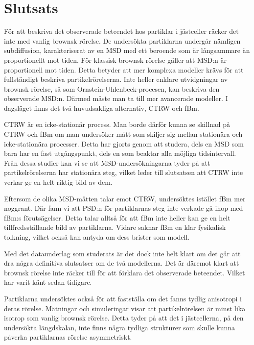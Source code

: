 \chapter{Slutsats}

För att beskriva det observerade beteendet hos partiklar i jästceller räcker det inte med vanlig brownsk rörelse. De undersökta partiklarna undergår nämligen subdiffusion, karakteriserat av en MSD med ett beroende som är långsammare än proportionellt mot tiden. För klassisk brownsk rörelse gäller att MSD:n är proportionell mot tiden. Detta betyder att mer komplexa modeller krävs för att fullständigt beskriva partikelrörelserna. 
Inte heller enklare utvidgningar av brownsk rörelse, så som Ornstein-Uhlenbeck-procesen, kan beskriva den observerade MSD:n. Därmed måste man ta till mer avancerade modeller. I dagsläget finns det två huvudsakliga alternativ, CTRW och fBm. 

CTRW är en icke-stationär process. Man borde därför kunna se skillnad på CTRW och fBm om man undersöker mått som skiljer sig mellan stationära och icke-stationära processer. Detta har gjorts genom att studera, dels en MSD som bara har en fast utgångspunkt, dels en som beaktar alla möjliga tidsintervall. Från dessa studier kan vi se att MSD-undersökningarna tyder på att partikelrörelserna har stationära steg, vilket leder till slutsatsen att CTRW inte verkar ge en helt riktig bild av dem.

Eftersom de olika MSD-måtten talar emot CTRW, undersöktes istället fBm mer noggrant. Där fann vi att PSD:n för partiklarnas steg inte verkade gå ihop med fBm:s förutsägelser. Detta talar alltså för att fBm inte heller kan ge en helt tillfredsställande bild av partiklarna. Vidare saknar fBm en klar fysikalisk tolkning, vilket också kan antyda om dess brister som modell.

Med det dataunderlag som studerats är det dock inte helt klart om det går att dra några definitiva slutsatser om de två modellerna. Det är däremot klart att brownsk rörelse inte räcker till för att förklara det observerade beteendet. Vilket har varit känt sedan tidigare.

Partiklarna undersöktes också för att fastställa om det fanns tydlig anisotropi i deras rörelse. Mätningar och simuleringar visar att partikelrörelsen är minst lika isotrop som vanlig brownsk rörelse. Detta tyder på att det i jästcellerna, på den undersökta längdskalan, inte finns några tydliga strukturer som skulle kunna påverka partiklarnas rörelse asymmetriskt. %

